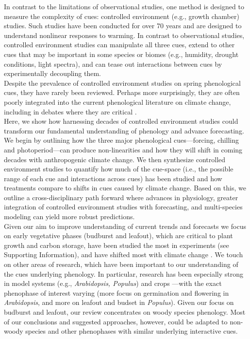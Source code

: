 \documentclass[11pt,letter]{article}
\begin{document}
In contrast to the limitations of observational studies, one method is designed to measure the complexity of cues: controlled environment (e.g., growth chamber) studies. Such studies have been conducted for over 70 years and are designed to understand nonlinear responses to warming. In contrast to observational studies, controlled environment studies can manipulate all three cues, extend to other cues that may be important in some species or biomes (e.g., humidity, drought conditions, light spectra), and can tease out interactions between cues by experimentally decoupling them.\\

Despite the prevalence of controlled environment studies on spring phenological cues, they have rarely been reviewed. Perhaps more surprisingly, they are often poorly integrated into the current phenological literature on climate change, including in debates where they are critical \citep[e.g.,][]{fu2015,richardson2018}.\\ %

Here, we show how harnessing decades of controlled environment studies could transform our fundamental understanding of phenology and advance forecasting. We begin by outlining how the three major phenological cues---forcing, chilling and photoperiod---can produce non-linearities and how they will shift in coming decades with anthropogenic climate change. We then synthesize controlled environment studies to quantify how much of the cue-space (i.e., the possible range of each cue and interactions across cues) has been studied and how treatments compare to shifts in cues caused by climate change. Based on this, we outline a cross-disciplinary path forward where advances in physiology, greater integration of controlled environment studies with forecasting, and multi-species modeling can yield more robust predictions.\\

Given our aim to improve understanding of current trends and forecasts we focus on early vegetative phases (budburst and leafout), which are critical to plant growth and carbon storage, have been studied the most in experiments (see Supporting Information), and have shifted most with climate change \citep{Cleland:2007or,IPCC:2014sm}. We touch on other areas of research, which have been important to our understanding of the cues underlying phenology. In particular, research has been especially strong in model systems (e.g., \emph{Arabidopsis, Populus}) and crops \citep{cesaraccio2004}---with the exact phenophase of interest varying (more focus on germination and flowering in \emph{Arabidopsis}, and more on leafout and budset in \emph{Populus}).  Given our focus on budburst and leafout, our review concentrates on woody species phenology. Most of our conclusions and suggested approaches, however, could be adapted to non-woody species and other phenophases with similar underlying interactive cues.
\end{document}
